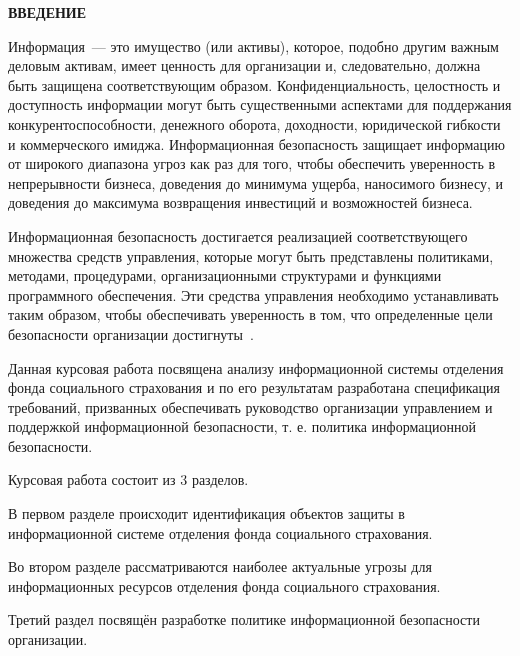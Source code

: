 \newpage

\begin{center}
  \Large{\textbf{ВВЕДЕНИЕ}}
\end{center}

Информация~--- это имущество (или активы), которое, подобно другим
важным деловым активам, имеет ценность для организации и,
следовательно, должна быть защищена соответствующим
образом. Конфиденциальность, целостность и доступность информации
могут быть существенными аспектами для поддержания
конкурентоспособности, денежного оборота, доходности, юридической
гибкости и коммерческого имиджа. Информационная безопасность защищает
информацию от широкого диапазона угроз как раз для того, чтобы
обеспечить уверенность в непрерывности бизнеса, доведения до минимума
ущерба, наносимого бизнесу, и доведения до максимума возвращения
инвестиций и возможностей бизнеса.

Информационная безопасность достигается реализацией соответствующего
множества средств управления, которые могут быть \linebreak представлены
политиками, методами, процедурами, организационными структурами и
функциями программного обеспечения. Эти средства управления необходимо
устанавливать таким образом, чтобы обеспечивать уверенность в том, что
определенные цели безопасности организации достигнуты~\cite{1}.

Данная курсовая работа посвящена анализу информационной системы
отделения фонда социального страхования и по его результатам
разработана спецификация требований, призванных обеспечивать
руководство организации управлением и поддержкой информационной
безопасности, т. е. политика информационной безопасности.

Курсовая работа состоит из 3 разделов.

В первом разделе происходит идентификация объектов защиты в
информационной системе отделения фонда социального страхования.

Во втором разделе рассматриваются наиболее актуальные угрозы для
информационных ресурсов отделения фонда социального страхования.

Третий раздел посвящён разработке политике информационной безопасности
организации.

\newpage


